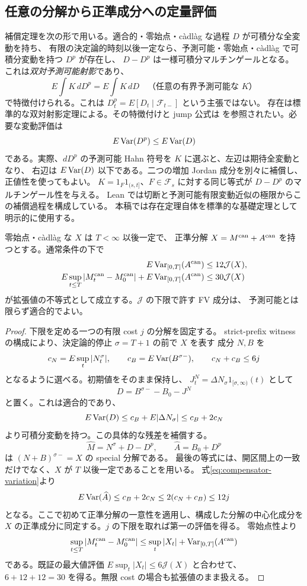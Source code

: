 \subsection{任意の分解から正準成分への定量評価}
\label{sec:canonical-cost}
補償定理を次の形で用いる。適合的・零始点・càdlàg な過程 $D$ が可積分な全変動を持ち、
有限の決定論的時刻以後一定なら、予測可能・零始点・càdlàg で可積分変動を持つ $D^p$ が存在し、
$D-D^p$ は一様可積分マルチンゲールとなる。
これは\emph{双対予測可能射影}であり、
\[
 E\int K\,dD^p=E\int K\,dD
 \quad\text{（任意の有界予測可能な }K\text{）}
\]
で特徴付けられる。これは $D^p_t=E[D_t\mid\mathcal F_{t-}]$ という主張ではない。
存在は標準的な双対射影定理による。その特徴付けと jump 公式は
\cite[Section 4.3]{Nikeghbali}を参照されたい。必要な変動評価は
\begin{equation}\label{eq:compensator-variation}
 E\operatorname{Var}(D^p)\leq E\operatorname{Var}(D)
\end{equation}
である。実際、$dD^p$ の予測可能 Hahn 符号を $K$ に選ぶと、左辺は期待全変動となり、
右辺は $E\operatorname{Var}(D)$ 以下である。二つの増加 Jordan 成分を別々に補償し、正値性を使ってもよい。
$K=1_F1_{(s,t]}$、$F\in\mathcal F_s$ に対する同じ等式が $D-D^p$ のマルチンゲール性を与える。
Lean では切断と予測可能有限変動近似の極限からこの補償過程を構成している。
本稿では存在定理自体を標準的な基礎定理として明示的に使用する。

\begin{lemma}
\label{lem:canonical-cost}
零始点・càdlàg な $X$ は $T<\infty$ 以後一定で、
正準分解 $X=M^{\rm can}+A^{\rm can}$ を持つとする。通常条件の下で
\[
 \begin{aligned}
 E\operatorname{Var}_{[0,T]}(A^{\rm can})&\leq12\mathcal J(X),\\
 E\sup_{t\leq T}|M^{\rm can}_t-M^{\rm can}_0|
       +E\operatorname{Var}_{[0,T]}(A^{\rm can})&\leq30\mathcal J(X)
 \end{aligned}
\]
が拡張値の不等式として成立する。$\mathcal J$ の下限で許す FV 成分は、
予測可能とは限らず適合的でよい。
\end{lemma}
\begin{proof}
下限を定める一つの有限 cost $j$ の分解を固定する。
strict-prefix witness の構成により、決定論的停止 $\sigma=T+1$ の前で $X$ を表す
成分 $N,B$ を
\[
 c_N=E\sup_t|N^\sigma_t|,\qquad
 c_B=E\operatorname{Var}(B^{\sigma-}),\qquad c_N+c_B\leq6j
\]
となるように選べる。初期値をそのまま保持し、
$J^N_t=\Delta N_\sigma1_{[\sigma,\infty)}(t)$ として
\[
 D=B^{\sigma-}-B_0-J^N
\]
と置く。これは適合的であり、
\[
 E\operatorname{Var}(D)\leq c_B+E|\Delta N_\sigma|\leq c_B+2c_N
\]
より可積分変動を持つ。この具体的な残差を補償する。
\[
 \widehat M=N^\sigma+D-D^p,\qquad \widehat A=B_0+D^p
\]
は $(N+B)^{\sigma-}=X$ の special 分解である。
最後の等式には、開区間上の一致だけでなく、$X$ が $T$ 以後一定であることを用いる。
式\eqref{eq:compensator-variation}より
\[
 E\operatorname{Var}(\widehat A)\leq c_B+2c_N\leq2(c_N+c_B)\leq12j
\]
となる。ここで初めて正準分解の一意性を適用し、構成した分解の中心化成分を
$X$ の正準成分に同定する。$j$ の下限を取れば第一の評価を得る。
零始点性より
\[
 \sup_{t\leq T}|M^{\rm can}_t-M^{\rm can}_0|
 \leq\sup_t|X_t|+\operatorname{Var}_{[0,T]}(A^{\rm can})
\]
である。既証の最大値評価 $E\sup_t|X_t|\leq6\mathcal J(X)$ と合わせて、
$6+12+12=30$ を得る。無限 cost の場合も拡張値のまま扱える。
\end{proof}

